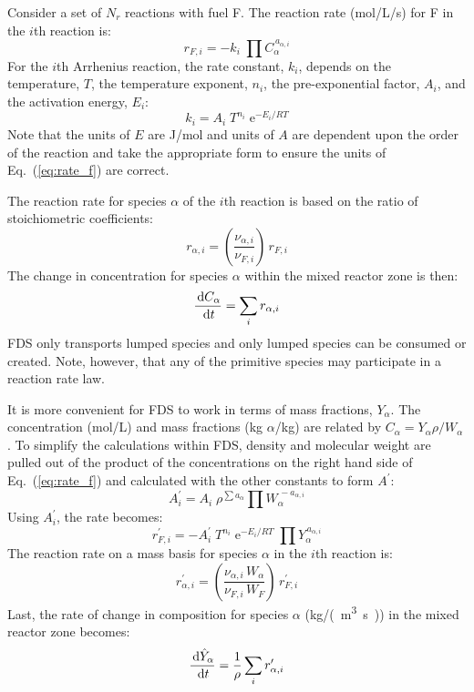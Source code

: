 Consider a set of $N_r$ reactions with fuel F. The reaction rate (mol/L/s) for F in the $i$th reaction is:
\begin{equation}\label{eq:rate_f}
r_{\si{F},i}= -k_{i}\; \prod C_{\alpha}^{\,a_{\alpha,i}}
\end{equation}
For the $i$th Arrhenius reaction, the rate constant, $k_i$, depends on the temperature, $T$, the temperature exponent, $n_i$, the pre-exponential factor, $A_i$, and the activation energy, $E_i$:
\begin{equation}\label{eq:rate_cons}
k_i = A_i\;T^{n_i}\;\mathrm{e}^{-E_i/RT}
\end{equation}
Note that the units of $E$ are J/mol and units of $A$ are dependent upon the order of the reaction and take the appropriate form to ensure the units of Eq.~(\ref{eq:rate_f}) are correct.

The reaction rate for species $\alpha$ of the $i$th reaction is based on the ratio of stoichiometric coefficients:
\begin{equation}\label{eq:rate_a}
r_{\alpha,i}= \left(\frac{\nu_{\alpha,i}}{\nu_{F,i}}\right)\,r_{\si{F},i}
\end{equation}
The change in concentration for species $\alpha$ within the mixed reactor zone is then:
\begin{equation}\label{rate_expression}
\frac{\,\mathrm{d} C_{\alpha}}{\,\mathrm{d} t} = \sum_{i} r_{\alpha,i}
\end{equation}
FDS only transports lumped species and only lumped species can be consumed or created.  Note, however, that any of the primitive species may participate in a reaction rate law.

It is more convenient for FDS to work in terms of mass fractions, $Y_{\alpha}$.  The concentration (mol/L) and mass fractions (kg $\alpha$/kg) are related by $C_{\alpha}=Y_{\alpha} \rho/W_{\alpha}$.
To simplify the calculations within FDS, density and molecular weight are pulled out of the product of the concentrations on the right hand side of Eq.~(\ref{eq:rate_f}) and calculated with the other constants to form $A^{\prime}$:
\begin{equation}\label{eq:aprime}
A^{\prime}_{i} = A_{i}\;\rho^{\sum a_{\alpha}}\prod W_{\alpha}^{\,-a_{\alpha,i}}
\end{equation}
Using $A_i^{\prime}$, the rate becomes:
\begin{equation}\label{eq:finite_rate_fin}
r^{\prime}_{F,i} = -A_i^{\prime}\;T^{n_i}\;\mathrm{e}^{-E_i/RT}\;\prod Y_{\alpha}^{\,a_{\alpha,i}}
\end{equation}
The reaction rate on a mass basis for species $\alpha$ in the $i$th reaction is:
\begin{equation}\label{eq:rate_a_y}
r^{\prime}_{\alpha,i}= \left(\frac{\nu_{\alpha,i}\,W_{\alpha}}{\nu_{F,i}\,W_{F}}\right)\,r^{\prime}_{F,i}
\end{equation}
Last, the rate of change in composition for species $\alpha$ (\si{kg/(m^3.s)}) in the mixed reactor zone becomes:
\begin{equation}\label{rate_expression_y}
\frac{\,\mathrm{d} \hat{Y}_{\alpha}}{\,\mathrm{d} t} = \frac{1}{\rho}\sum_{i} r^{\prime}_{\alpha,i}
\end{equation}



